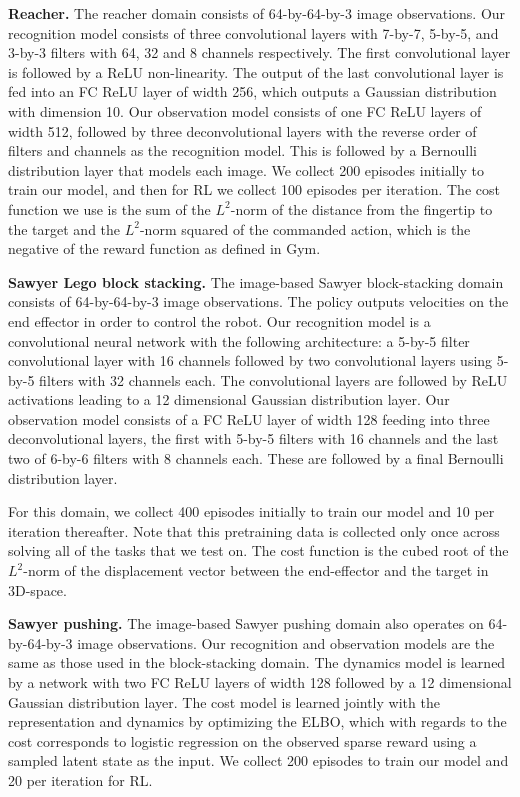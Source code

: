 {\bf Reacher.} The reacher domain consists of \mbox{64-by-64-by-3} image observations. Our recognition model consists of three convolutional layers with \mbox{7-by-7}, \mbox{5-by-5}, and \mbox{3-by-3} filters with 64, 32 and 8 channels respectively. The first convolutional layer is followed by a ReLU non-linearity. The output of the last convolutional layer is fed into an FC ReLU layer of width 256, which outputs a Gaussian distribution with dimension 10. Our observation model consists of one FC ReLU layers of width 512, followed by three deconvolutional layers with the reverse order of filters and channels as the recognition model. This is followed by a Bernoulli distribution layer that models each image. We collect 200 episodes initially to train our model, and then for RL we collect 100 episodes per iteration. The cost function we use is the sum of the $L^2$-norm of the distance from the fingertip to the target and the $L^2$-norm squared of the commanded action, which is the negative of the reward function as defined in Gym.

{\bf Sawyer Lego block stacking.} The image-based Sawyer block-stacking domain consists of \mbox{64-by-64-by-3} image observations. The policy outputs velocities on the end effector in order to control the robot. Our recognition model is a convolutional neural network with the following architecture: a \mbox{5-by-5} filter convolutional layer with 16 channels followed by two convolutional layers using \mbox{5-by-5} filters with 32 channels each. The convolutional layers are followed by ReLU activations leading to a 12 dimensional Gaussian distribution layer. Our observation model consists of a FC ReLU layer of width 128 feeding into three deconvolutional layers, the first with \mbox{5-by-5} filters with 16 channels and the last two of \mbox{6-by-6} filters with 8 channels each. These are followed by a final Bernoulli distribution layer.

For this domain, we collect 400 episodes initially to train our model and 10 per iteration thereafter. Note that this pretraining data is collected only once across solving all of the tasks that we test on. The cost function is the cubed root of the $L^2$-norm of the displacement vector between the end-effector and the target in 3D-space.

{\bf Sawyer pushing.} The image-based Sawyer pushing domain also operates on \mbox{64-by-64-by-3} image observations. Our recognition and observation models are the same as those used in the block-stacking domain. The dynamics model is learned by a network with two FC ReLU layers of width 128 followed by a 12 dimensional Gaussian distribution layer. The cost model is learned jointly with the representation and dynamics by optimizing the ELBO, which with regards to the cost corresponds to logistic regression on the observed sparse reward using a sampled latent state as the input. We collect 200 episodes to train our model and 20 per iteration for RL.

